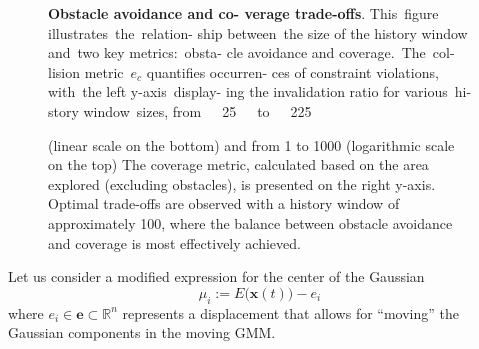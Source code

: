 \documentclass[letterpaper,10pt,conference,twoside]{IEEEtran}
\theoremstyle{definition}
\begin{document}
\begin{figure}[t!]
  \begin{minipage}[t!]{.26\columnwidth}
    \caption[Trade-offs between obstacle avoidance and coverage]{\textbf{Obstacle avoidance and co- verage trade-offs}. This~figure illustrates~the~relation- ship between~the size of the history window and~two key metrics:~obsta- cle avoidance and coverage.~The~col- lision metric~$e_c$ quantifies occurren- ces of constraint violations, with~the left y-axis~display- ing the invalidation ratio for various~hi- story window~sizes, from~~~25~~~to~~~225}
    \label{fig:0}
  \end{minipage}\hspace*{.3cm}
  \begin{minipage}[t!]{.7\columnwidth}
    \vspace*{-.3cm}
    
  \end{minipage}
  \vspace*{-.4cm}
  \caption*{\footnotesize (linear scale on the bottom) and from 1 to 1000 (logarithmic scale on the top) The coverage metric, calculated based on the area explored (excluding obstacles), is presented on the right y-axis. Optimal trade-offs are observed with a history window of approximately 100, where the balance between obstacle avoidance and coverage is most effectively achieved.}
\end{figure}

Let us consider a modified expression for the center of the Gaussian
\begin{equation}
  \mu_i:=E\big(\mathbf{x}(t)\big)-e_i
\end{equation}
where $e_i\in\mathbf{e}\subset\mathbb{R}^n$ represents a displacement that allows for ``moving'' the Gaussian components in the moving GMM.
\end{document}
